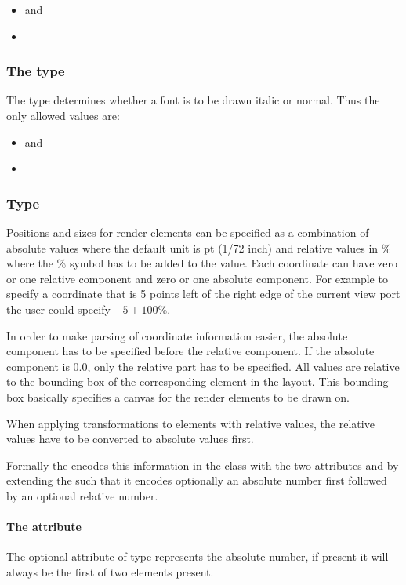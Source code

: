 \begin{itemize}
 \item {} and
 \item {} 
\end{itemize}

\subsubsection{The  type}
\label{fontstyle-type}
The type  determines whether a font is to be
drawn italic or normal. Thus the only allowed values are:

\begin{itemize}
 \item {} and
 \item {} 
\end{itemize}

\subsubsection{Type \fixttspace{}}
\label{relabsvector}
Positions and sizes for render elements can be specified as a combination 
of absolute values where the default unit is pt (1/72 inch) and relative values 
in \% where the \% symbol has to be added to the value. Each coordinate can 
have zero or one relative component and zero or one absolute component.
For example to specify a coordinate that is 5 points left of the right edge 
of the current view port the user could specify $-5+100\%$. 

In order to make parsing of coordinate information easier, the absolute 
component has to be specified before the relative component. If the absolute 
component is 0.0, only the relative part has to be specified.
All values are relative to the bounding box of the corresponding 
element in the layout. This bounding box basically specifies a canvas for the 
render elements to be drawn on.

When applying transformations to elements with relative values, the relative 
values have to be converted to absolute values first.

Formally the \RenderPackage encodes this information in the \RelAbsVector class with 
the two attributes  and  by extending the 
such that it encodes optionally an absolute number first followed by an optional 
relative number. 

\paragraph{The \fixttspace{} attribute}
The optional attribute  of type  represents the absolute
number, if present it will always be the first of two elements present.

